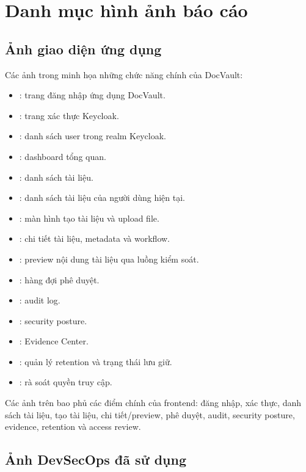 \chapter{Danh mục hình ảnh báo cáo}

\section{Ảnh giao diện ứng dụng}

Các ảnh trong  minh họa những chức năng chính của DocVault:

\begin{itemize}
  \item {}: trang đăng nhập ứng dụng DocVault.
  \item {}: trang xác thực Keycloak.
  \item {}: danh sách user trong realm Keycloak.
  \item {}: dashboard tổng quan.
  \item {}: danh sách tài liệu.
  \item {}: danh sách tài liệu của người dùng hiện tại.
  \item {}: màn hình tạo tài liệu và upload file.
  \item {}: chi tiết tài liệu, metadata và workflow.
  \item {}: preview nội dung tài liệu qua luồng kiểm soát.
  \item {}: hàng đợi phê duyệt.
  \item {}: audit log.
  \item {}: security posture.
  \item {}: Evidence Center.
  \item {}: quản lý retention và trạng thái lưu giữ.
  \item {}: rà soát quyền truy cập.
\end{itemize}

Các ảnh trên bao phủ các điểm chính của frontend: đăng nhập, xác thực, danh sách tài liệu, tạo tài liệu, chi tiết/preview, phê duyệt, audit, security posture, evidence, retention và access review.

\section{Ảnh DevSecOps đã sử dụng}

